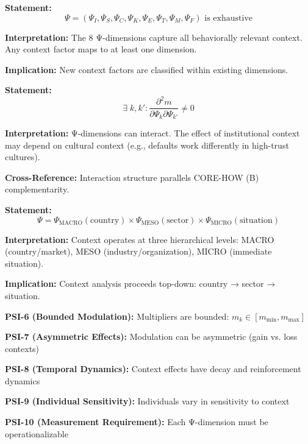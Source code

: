 \begin{tcolorbox}[colback=gray!5!white, colframe=gray!75!black,
    title=Axiom PSI-3: Dimension Completeness]
\textbf{Statement:}
\begin{equation}
\Psi = (\Psi_I, \Psi_S, \Psi_C, \Psi_K, \Psi_E, \Psi_T, \Psi_M, \Psi_F) \text{ is exhaustive}
\end{equation}

\textbf{Interpretation:} The 8 Ψ-dimensions capture all behaviorally relevant context.
Any context factor maps to at least one dimension.

\textbf{Implication:} New context factors are classified within existing dimensions.
\end{tcolorbox}

\begin{tcolorbox}[colback=gray!5!white, colframe=gray!75!black,
    title=Axiom PSI-4: Dimension Interactions]
\textbf{Statement:}
\begin{equation}
\exists \; k, k': \frac{\partial^2 m}{\partial \Psi_k \partial \Psi_{k'}} \neq 0
\end{equation}

\textbf{Interpretation:} Ψ-dimensions can interact. The effect of institutional context
may depend on cultural context (e.g., defaults work differently in high-trust cultures).

\textbf{Cross-Reference:} Interaction structure parallels CORE-HOW (B) complementarity.
\end{tcolorbox}

\begin{tcolorbox}[colback=gray!5!white, colframe=gray!75!black,
    title=Axiom PSI-5: Hierarchy (MACRO-MESO-MICRO)]
\textbf{Statement:}
\begin{equation}
\Psi = \Psi_{\text{MACRO}}(\text{country}) \times \Psi_{\text{MESO}}(\text{sector}) \times \Psi_{\text{MICRO}}(\text{situation})
\end{equation}

\textbf{Interpretation:} Context operates at three hierarchical levels:
MACRO (country/market), MESO (industry/organization), MICRO (immediate situation).

\textbf{Implication:} Context analysis proceeds top-down: country → sector → situation.
\end{tcolorbox}

\begin{tcolorbox}[colback=gray!5!white, colframe=gray!75!black,
    title=Axioms PSI-6 to PSI-10: Modulation Properties]

\textbf{PSI-6 (Bounded Modulation):} Multipliers are bounded: $m_k \in [m_{\min}, m_{\max}]$

\textbf{PSI-7 (Asymmetric Effects):} Modulation can be asymmetric (gain vs. loss contexts)

\textbf{PSI-8 (Temporal Dynamics):} Context effects have decay and reinforcement dynamics

\textbf{PSI-9 (Individual Sensitivity):} Individuals vary in sensitivity to context

\textbf{PSI-10 (Measurement Requirement):} Each Ψ-dimension must be operationalizable
\end{tcolorbox}


